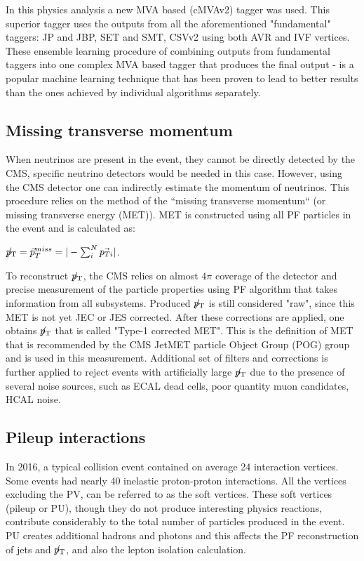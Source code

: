 In this physics analysis a new MVA based (cMVAv2) tagger was used. This superior tagger uses the outputs from all the aforementioned "fundamental" taggers: JP and JBP, SET and SMT, CSVv2 using both AVR and IVF vertices. These ensemble learning procedure \cite{ensemble_learning} of combining outputs from fundamental taggers into one complex MVA based tagger that produces the final output - is a popular machine learning technique that has been proven to lead to better results than the ones achieved by individual algorithms separately. 

\subsection{Missing transverse momentum}\label{sec:met}

When neutrinos are present in the event, they cannot be directly detected by the CMS, specific neutrino detectors would be needed in this case. However, using the CMS detector one can indirectly estimate the momentum of neutrinos. This procedure relies on the method of the ``missing  transverse momentum`` \PTslash (or missing transverse energy  \ETslash (MET)).  MET is constructed using all PF particles in the event and is calculated as:

${p}_\mathrm{T}\hspace{-1.02em}/\kern 0.5em = \vec{p}^{miss}_T = |- \sum^N_i \vec{p_{Ti}} |$. 

To reconstruct ${p}_\mathrm{T}\hspace{-1.02em}/\kern 0.5em$, the CMS relies on almost $4 \pi$ coverage of the detector and precise measurement of the particle properties using PF algorithm that takes information from all subsystems. Produced ${p}_\mathrm{T}\hspace{-1.02em}/\kern 0.5em$ is still considered "raw", since this MET is not yet JEC or JES corrected. After these corrections are applied, one obtains  ${p}_\mathrm{T}\hspace{-1.02em}/\kern 0.5em$ that is called "Type-1 corrected MET". This is the definition of MET that is recommended by the CMS JetMET particle Object Group (POG) group and is used in this measurement. Additional set of filters and corrections is further applied to reject events with artificially large ${p}_\mathrm{T}\hspace{-1.02em}/\kern 0.5em$ due to the presence of several noise sources, such as ECAL dead cells, poor quantity muon candidates, HCAL noise. 

\subsection{Pileup interactions}\label{sec:pileup}

In 2016, a typical collision event contained on average 24 interaction vertices. Some events had nearly 40 inelastic proton-proton interactions. All the vertices excluding the PV, can be referred to as the soft vertices. These soft vertices (pileup or PU), though they do not produce interesting physics reactions, contribute considerably to the total number of particles produced in the event. PU creates additional hadrons and photons and this affects the PF reconstruction of jets and ${p}_\mathrm{T}\hspace{-1.02em}/\kern 0.5em$, and also the lepton isolation calculation.

